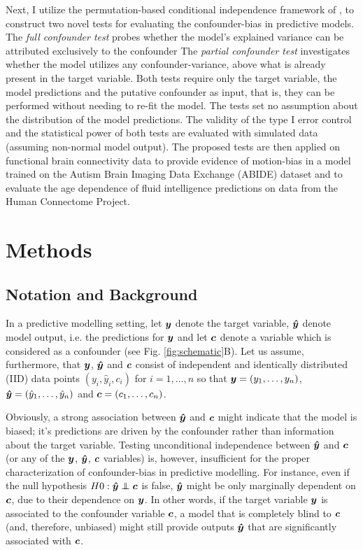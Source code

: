 \documentclass{article}
\begin{document}
Next, I utilize the permutation-based conditional independence framework of \cite{berrett2020conditional}, to construct two novel tests for evaluating the confounder-bias in predictive models.
The \emph{full confounder test} probes whether the model's explained variance can be attributed exclusively to the confounder
The \emph{partial confounder test} investigates whether the model utilizes any confounder-variance, above what is already present in the target variable.
Both tests require only the target variable, the model predictions and the putative confounder as input, that is, they can be performed without needing to re-fit the model.
The tests set no assumption about the distribution of the model predictions.
The validity of the type I error control and the statistical power of both tests are evaluated with simulated data (assuming non-normal model output).
The proposed tests are then applied on functional brain connectivity data to provide evidence of motion-bias in a model trained on the Autism Brain Imaging Data Exchange (ABIDE) dataset \citep{di2014autism} and to evaluate the age dependence of fluid intelligence predictions on data from the Human Connectome Project.

\section{Methods}

\subsection{Notation and Background}

In a predictive modelling setting, let $\boldsymbol{y}$ denote the target variable, $\boldsymbol{\hat{y}}$ denote model output, i.e. the predictions for $\boldsymbol{y}$ and let $\boldsymbol{c}$ denote a variable which is considered as a confounder (see Fig. \ref{fig:schematic}B). Let us assume, furthermore, that $\boldsymbol{y}$, $\boldsymbol{\hat{y}}$ and $\boldsymbol{c}$ consist of independent and identically distributed (IID) data points $(y_i, \hat{y}_i, c_i)$ for $i=1, \dots , n$ so that $\boldsymbol{y}=(y_1, \dots ,y_n)$, $\boldsymbol{\hat{y}}=(\hat{y}_1, \dots, \hat{y}_n)$ and $\boldsymbol{c}=(c_1, \dots, c_n)$. 

Obviously, a strong association between $\boldsymbol{\hat{y}}$ and $\boldsymbol{c}$ might indicate that the model is biased; it's predictions are driven by the confounder rather than information about the target variable.
Testing unconditional independence between $\boldsymbol{\hat{y}}$ and $\boldsymbol{c}$ (or any of the $\boldsymbol{y}$, $\boldsymbol{\hat{y}}$, $\boldsymbol{c}$ variables) is, however, insufficient for the proper characterization of confounder-bias in predictive modelling.
For instance, even if the null hypothesis $H0 : \yhat \independent \c$ is false, $\boldsymbol{\hat{y}}$ might be only marginally dependent on $\boldsymbol{c}$, due to their dependence on $\boldsymbol{y}$. In other words, if the target variable $\boldsymbol{y}$ is associated to the confounder variable $\boldsymbol{c}$, a model that is completely blind to $\boldsymbol{c}$ (and, therefore, unbiased) might still provide outputs $\boldsymbol{\hat{y}}$ that are significantly associated with $\boldsymbol{c}$.
\end{document}
